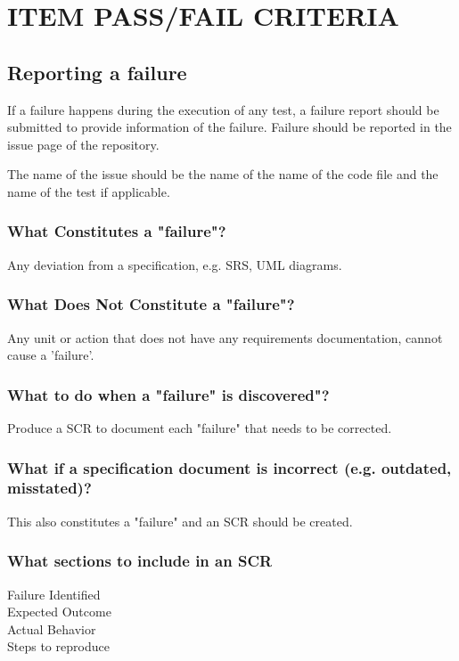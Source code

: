 \documentclass[report]{article}
\begin{document}
\section[ITEM PASS/FAIL CRITERIA]{ITEM PASS/FAIL CRITERIA}

\subsection{Reporting a failure}

If a failure happens during the execution of any test, a failure report should be submitted to provide information of the failure. Failure should be reported in the issue page of the repository. 

The name of the issue should be the name of the name of the code file and the name of the test if applicable.

\subsubsection{What Constitutes a "failure"?}
Any deviation from a specification, e.g. SRS, UML diagrams.

\subsubsection{What Does Not Constitute a "failure"?}
Any unit or action that does not have any requirements documentation, cannot cause a 'failure'.

\subsubsection{What to do when a "failure" is discovered"?}
Produce a SCR to document each "failure" that needs to be corrected.

\subsubsection{What if a specification document is incorrect (e.g. outdated, misstated)?}
This also constitutes a "failure" and an SCR should be created.

\subsubsection{What sections to include in an SCR}

Failure Identified\\
Expected Outcome \\
Actual Behavior \\
Steps to reproduce \\
\end{document}
